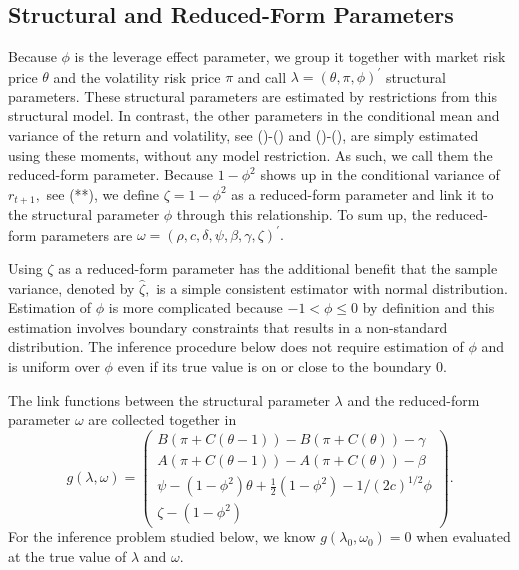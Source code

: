 \documentclass[11pt, letterpaper, twoside]{article}
\begin{document}
\subsection{Structural and Reduced-Form Parameters}

Because $\phi $ is the leverage effect parameter, we group it together with market risk price $\theta $ and the volatility risk price $\pi $ and call $ \lambda =(\theta ,\pi ,\phi )^{\prime }$ structural parameters. These structural parameters are estimated by restrictions from this structural model. In contrast, the other parameters in the conditional mean and variance of the return and volatility, see ()-() and ()-(), are simply estimated using these moments, without any model restriction. As such, we call them the reduced-form parameter. Because $1-\phi ^{2}$ shows up in the conditional variance of $r_{t+1},$ see (**), we define $\zeta =1-\phi ^{2}$ as a reduced-form parameter and link it to the structural parameter $\phi $ through this relationship. To sum up, the reduced-form parameters are $\omega =(\rho ,c,\delta ,\psi ,\beta ,\gamma ,\zeta )^{\prime }.$

Using $\zeta $ as a reduced-form parameter has the additional benefit that
the sample variance, denoted by $\widehat{\zeta },$ is a simple consistent
estimator with normal distribution. Estimation of $\phi $ is more
complicated because $-1<\phi \leq 0$ by definition and this estimation
involves boundary constraints that results in a non-standard distribution.
The inference procedure below does not require estimation of $\phi $ and is
uniform over $\phi $ even if its true value is on or close to the boundary $%
0.$

The link functions between the structural parameter $\lambda $ and the
reduced-form parameter $\omega $ are collected together in%
\begin{equation}
   g(\lambda, \omega) = 
%
    \begin{pmatrix}
        B\left( \pi +C\left( \theta -1\right) \right) -B\left( \pi +C\left( \theta \right) \right) -\gamma  \\ 
        A\left( \pi +C\left( \theta -1\right) \right) -A\left( \pi +C\left( \theta \right) \right) -\beta  \\ 
        \psi -(1-\phi ^{2})\theta +\frac{1}{2}(1-\phi ^{2})-1/(2c)^{1/2}\phi  \\ \zeta -\left( 1-\phi ^{2}\right) 
    \end{pmatrix}.
\end{equation}%
For the inference problem studied below, we know $g(\lambda _{0},\omega
_{0})=0$ when evaluated at the true value of $\lambda $ and $\omega .$
\end{document}

